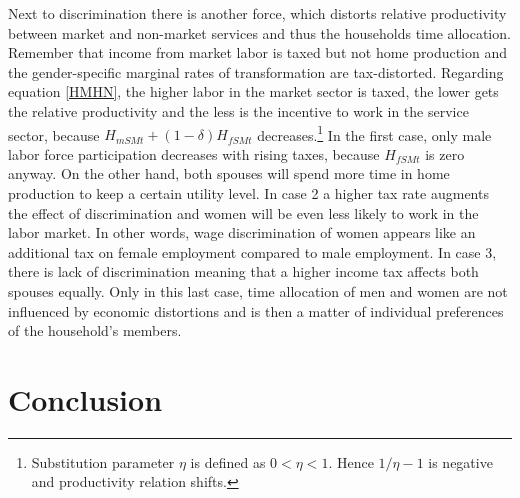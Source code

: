 \documentclass[a4paper,12pt]{article}
\begin{document}
Next to discrimination there is another force, which distorts relative productivity between market and non-market services and thus the households time allocation. Remember that income from market labor is taxed but not home production and the gender-specific marginal rates of transformation are tax-distorted. Regarding equation \eqref{HMHN}, the higher labor in the market sector is taxed, the lower gets the relative productivity 
and the less is the incentive to work in the service sector, because $H_{mSMt}+(1-\delta)H_{fSMt}$ decreases.\footnote{Substitution parameter $\eta$ is defined as $0<\eta <1$. Hence $1/{\eta -1}$ is negative and productivity relation shifts.} In the first case, only male labor force participation decreases with rising taxes, because $H_{fSMt}$ is zero anyway. On the other hand, both spouses will spend more time in home production to keep a certain utility level. In case 2 a higher tax rate augments the effect of discrimination and women will be even less likely to work in the labor market. In other words, wage discrimination of women appears like an additional tax on female employment compared to male employment. In case 3, there is lack of discrimination meaning that a higher income tax affects both spouses equally. Only in this last case, time allocation of men and women are not influenced by economic distortions and is then a matter of individual preferences of the household's members.\\



\section{Conclusion}
\end{document}
